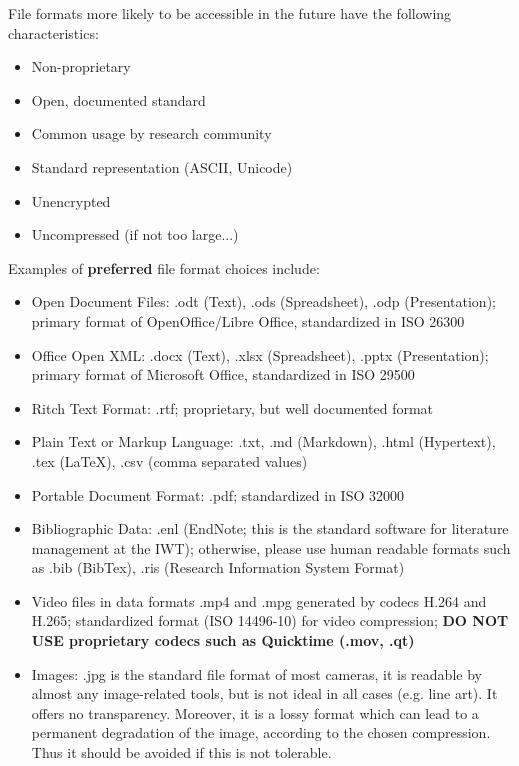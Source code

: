 File formats more likely to be accessible in the future have the following
characteristics:
\begin{itemize}
  \item Non-proprietary
  \item Open, documented standard
  \item Common usage by research community
  \item Standard representation (ASCII, Unicode)
  \item Unencrypted
  \item Uncompressed (if not too large...)
\end{itemize}

\noindent Examples of \textbf{preferred} file format choices include:
\begin{itemize}
  \item Open Document Files: .odt (Text), .ods (Spreadsheet),
        .odp (Presentation); primary format of OpenOffice/Libre Office,
        standardized in ISO 26300
  \item Office Open XML: .docx (Text), .xlsx (Spreadsheet),
        .pptx (Presentation); primary format of Microsoft Office,
        standardized in ISO 29500
  \item Ritch Text Format: .rtf; proprietary, but well documented format
  \item Plain Text or Markup Language: .txt, .md (Markdown), .html (Hypertext),
       .tex (LaTeX), .csv (comma separated values)
  \item Portable Document Format: .pdf; standardized in ISO 32000
  \item Bibliographic Data: .enl (EndNote; this is the standard software for
        literature management at the IWT); otherwise, please use human readable
        formats such as .bib (BibTex), .ris (Research Information System Format)
  \item Video files in data formats .mp4 and .mpg generated by codecs H.264 and
        H.265; standardized format (ISO 14496-10) for video compression;
        \textbf{DO NOT USE proprietary codecs such as Quicktime (.mov, .qt)}
  \item Images: .jpg is the standard file format of most cameras, it is readable
        by almost any image-related tools, but is not ideal in all cases (e.g.
        line art). It offers no transparency. Moreover, it is a lossy format
        which can lead to a permanent degradation of the image, according to the
        chosen compression. Thus it should be avoided if this is not tolerable.

\end{itemize}
